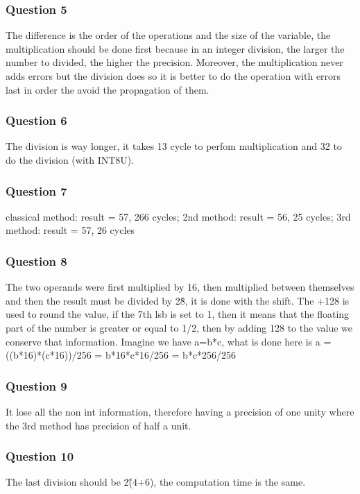 \documentclass[a4paper,10pt]{article}
\begin{document}
\subsubsection*{Question 5}
The difference is the order of the operations and the size of the variable, the multiplication should be done first because in an integer division, the larger the number to divided, the higher the precision. Moreover, the multiplication never adds errors but the division does so it is better to do the operation with errors last in order the avoid the propagation of them.

\subsubsection*{Question 6}
The division is way longer, it takes 13 cycle to perfom multiplication and 32 to do the division (with INT8U).

\subsubsection*{Question 7}
classical method: result = 57, 266 cycles; 
2nd method: result = 56, 25 cycles; 
3rd method: result = 57, 26 cycles

\subsubsection*{Question 8}
The two operands were first multiplied by 16, then multiplied between themselves and then the result must be divided by 2\^8, it is done with the shift. The +128 is used to round the value, if the 7th lsb is set to 1, then it means that the floating part of the number is greater or equal to 1/2, then by adding 128 to the value we conserve that information. Imagine we have a=b*c, what is done here is a = ((b*16)*(c*16))/256 = b*16*c*16/256 = b*c*256/256

\subsubsection*{Question 9}
It lose all the non int information, therefore having a precision of one unity where the 3rd method has precision of half a unit.

\subsubsection*{Question 10}
The last division should be 2\^(4+6), the computation time is the same.
\end{document}
